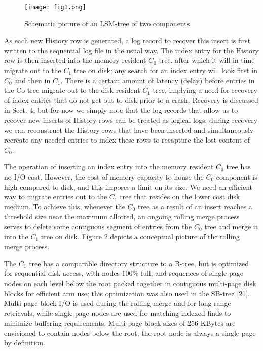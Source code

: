 \documentclass[a4paper,12pt,notitlepage,twoside,openright]{article}
\begin{document}
\begin{figure}
  \centering
  \texttt{[image: fig1.png]}
  \caption{Schematic picture of an LSM-tree of two components}
\end{figure}

As each new History row is generated, a log record to recover this
insert is first written to the sequential log file in the usual way. The
index entry for the History row is then inserted into the memory
resident \(C_0\) tree, after which it will in time migrate out to the \(C_1\) tree
on disk; any search for an index entry will look first in \(C_0\) and then in
\(C_1\). There is a certain amount of latency (delay) before entries in the
Co tree migrate out to the disk resident \(C_1\) tree, implying a need for
recovery of index entries that do not get out to disk prior to a crash.
Recovery is discussed in Sect. 4, but for now we simply note that the
log records that allow us to recover new inserts of History rows can be
treated as logical logs; during recovery we can reconstruct the History
rows that have been inserted and simultaneously recreate any needed
entries to index these rows to recapture the lost content of \(C_0\).

The operation of inserting an index entry into the memory resident \(C_0\)
tree has no I/O cost. However, the cost of memory capacity to house the
\(C_0\) component is high compared to disk, and this imposes a limit on its
size. We need an efficient way to migrate entries out to the \(C_1\) tree that
resides on the lower cost disk medium. To achieve this, whenever the \(C_0\)
tree as a result of an insert reaches a threshold size near the maximum
allotted, an ongoing rolling merge process serves to delete some
contiguous segment of entries from the \(C_0\) tree and merge it into the \(C_1\)
tree on disk. Figure 2 depicts a conceptual picture of the rolling merge
process.

The \(C_1\) tree has a comparable directory structure to a B-tree, but is
optimized for sequential disk access, with nodes 100\% full, and
sequences of single-page nodes on each level below the root packed
together in contiguous multi-page disk blocks for efficient arm use; this
optimization was also used in the SB-tree {[}21{]}. Multi-page block I/O
is used during the rolling merge and for long range retrievals, while
single-page nodes are used for matching indexed finds to minimize
buffering requirements. Multi-page block sizes of 256 KBytes are
envisioned to contain nodes below the root; the root node is always a
single page by definition.
\end{document}
